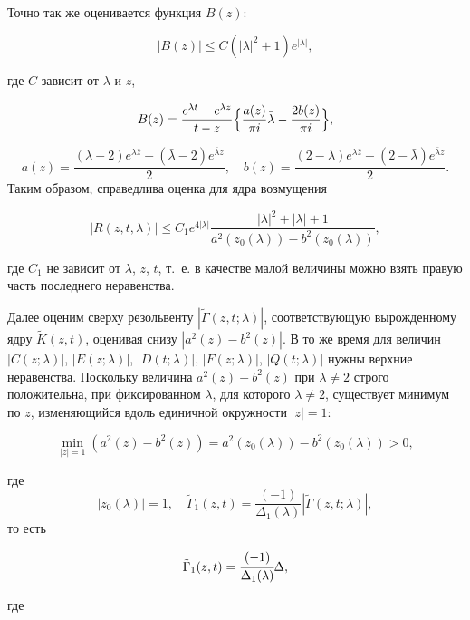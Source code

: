 Точно так же оценивается функция $B(z)$:

\[

|B(z)| \le C\left(|\lambda |^2  + 1 \right)   e^{|\lambda |},

\]

где $C$ зависит от $\lambda $ и $z$, 

$$B(z) = \frac{e^{\bar \lambda t}  - e^{\bar \lambda z} }{t - z}   

\Bigl\{ \frac{a(z)}{\pi i}\bar \lambda  - \frac{2b(z)}{\pi i} \Bigr\},$$

$$  a(z) = \frac{(\lambda  - 2)   e^{\lambda \bar z}  + (\bar \lambda  - 2)   e^{\bar \lambda z}}{2}, \quad b(z) = \frac{(2 - \lambda )e^{\lambda \bar z}  - (2 - \bar \lambda )e^{\bar \lambda z}}{2}.$$ Таким образом, справедлива оценка для ядра возмущения

\[

|R(z,t,\lambda )| \le C_1 e^{4|\lambda |} 

\frac{|\lambda |^2  + |\lambda | + 1}{a^2 (z_0 (\lambda )) - b^2 (z_0 (\lambda ))},

\]

где  $C_1 $ не зависит от $\lambda $, $z$, $t$, т.~е. в качестве малой величины можно взять правую часть последнего неравенства. 



Далее оценим  сверху резольвенту $|\tilde \Gamma (z,t;\lambda )|$, соответствующую вырожденному ядру $\tilde K(z,t)$, оценивая снизу $|a^2 (z) - b^2 (z)|$. В то же время для величин $|C(z;\lambda )|$, $|E(z;\lambda )|$, $|D(t;\lambda )|$, $|F(z;\lambda )|$, $|Q(t;\lambda )|$ нужны верхние неравенства. Поскольку величина $a^2 (z) - b^2 (z)$ при $\lambda  \ne 2$ строго положительна,  при фиксированном $\lambda $, для которого $\lambda  \ne 2$, существует минимум по $z$, изменяющийся вдоль единичной окружности $|z| = 1$:

\[

\min\limits_{|z|=1} \left(a^2(z)-b^2(z)\right)=a^2\left(z_0(\lambda)\right)-b^2\left(z_0(\lambda)\right)>0,

\]

где  $$|z_0 (\lambda )| = 1, \quad \tilde \Gamma _1 (z,t) = \frac{( - 1)}{\Delta _1 (\lambda )}|\tilde \Gamma (z,t;\lambda)|,$$ то есть

$$

\tilde{\Gamma}_1(z,t)=\cfrac{(-1)}{\Delta_1(\lambda)}\Delta,

$$

где

